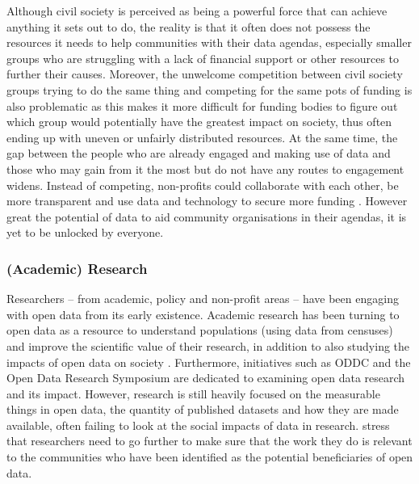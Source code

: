 Although civil society is perceived as being a powerful force that can achieve anything it sets out to do, the reality is that it often does not possess the resources it needs to help communities with their data agendas, especially smaller groups who are struggling with a lack of financial support or other resources to further their causes. Moreover, the unwelcome competition between civil society groups trying to do the same thing and competing for the same pots of funding is also problematic \citep{johnson_neighbourhood_2018} as this makes it more difficult for funding bodies to figure out which group would potentially have the greatest impact on society, thus often ending up with uneven or unfairly distributed resources. At the same time, the gap between the people who are already engaged and making use of data and those who may gain from it the most but do not have any routes to engagement widens. Instead of competing, non-profits could collaborate with each other, be more transparent and use data and technology to secure more funding \citep{goecks_charitable_2008,johnson_neighbourhood_2018}. However great the potential of data to aid community organisations in their agendas, it is yet to be unlocked by everyone.

\subsubsection{(Academic) Research}
Researchers -- from academic, policy and non-profit areas -- have been engaging with open data from its early existence. Academic research has been turning to open data as a resource to understand populations (using data from censuses) and improve the scientific value of their research, in addition to also studying the impacts of open data on society \citep{hossain_state---art_2016,van_schalkwyk_state_2017}. Furthermore, initiatives such as ODDC and the Open Data Research Symposium are dedicated to examining open data research and its impact. However, research is still heavily focused on the measurable things in open data, the quantity of published datasets and how they are made available, often failing to look at the social impacts of data in research. \citet{davies_state_2019} stress that researchers need to go further to make sure that the work they do is relevant to the communities who have been identified as the potential beneficiaries of open data.

